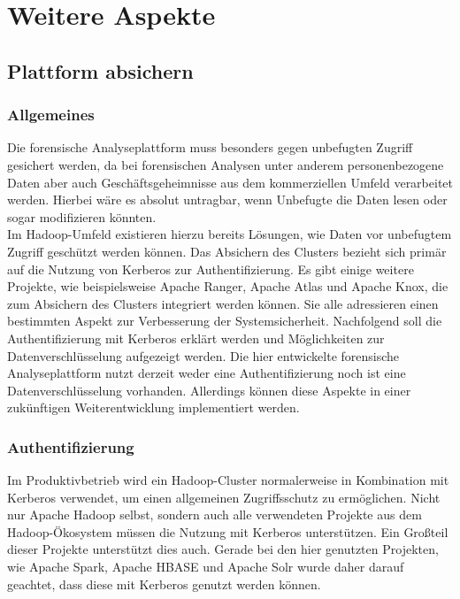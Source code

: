 \chapter{Weitere Aspekte}
\label{ch:additional_aspects}

\section{Plattform absichern}
\label{sec:secure_platform}
\subsection{Allgemeines}
Die forensische Analyseplattform muss besonders gegen unbefugten Zugriff gesichert werden, da bei forensischen Analysen unter anderem personenbezogene Daten aber auch Geschäftsgeheimnisse aus dem kommerziellen Umfeld verarbeitet werden. Hierbei wäre es absolut untragbar, wenn Unbefugte die Daten lesen oder sogar modifizieren könnten.\\

\noindent
Im Hadoop-Umfeld existieren hierzu bereits Lösungen, wie Daten vor unbefugtem Zugriff geschützt werden können. Das Absichern des Clusters bezieht sich primär auf die Nutzung von Kerberos zur Authentifizierung. Es gibt einige weitere Projekte, wie beispielsweise Apache Ranger, Apache Atlas und Apache Knox, die zum Absichern des Clusters integriert werden können. Sie alle adressieren einen bestimmten Aspekt zur Verbesserung der Systemsicherheit. Nachfolgend soll die Authentifizierung mit Kerberos erklärt werden und Möglichkeiten zur Datenverschlüsselung aufgezeigt werden. Die hier entwickelte forensische Analyseplattform nutzt derzeit weder eine Authentifizierung noch ist eine Datenverschlüsselung vorhanden. Allerdings können diese Aspekte in einer zukünftigen Weiterentwicklung implementiert werden.

\subsection{Authentifizierung}

Im Produktivbetrieb wird ein Hadoop-Cluster normalerweise in Kombination mit Kerberos verwendet, um einen allgemeinen Zugriffsschutz zu ermöglichen.\cite{hadoop_security} Nicht nur Apache Hadoop selbst, sondern auch alle verwendeten Projekte aus dem Hadoop-Ökosystem müssen die Nutzung mit Kerberos unterstützen. Ein Großteil dieser Projekte unterstützt dies auch. Gerade bei den hier genutzten Projekten, wie Apache Spark, Apache HBASE und Apache Solr wurde daher darauf geachtet, dass diese mit Kerberos genutzt werden können.\\

